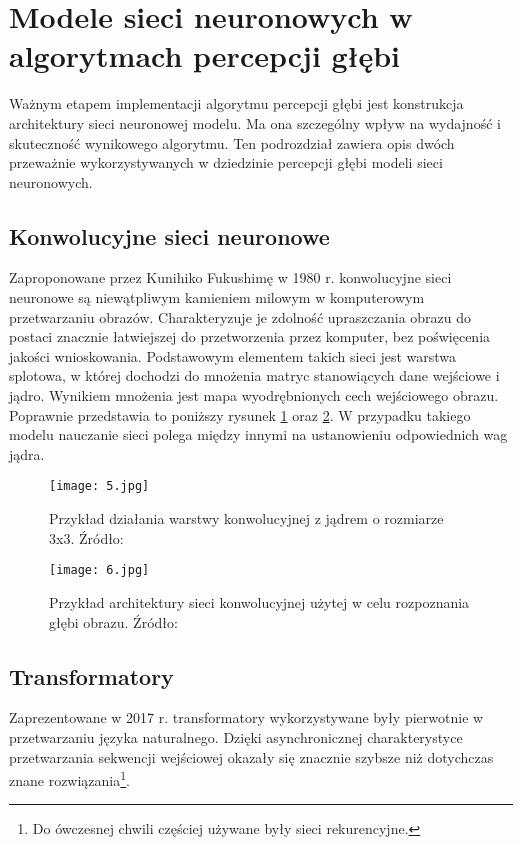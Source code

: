\section{Modele sieci neuronowych w algorytmach percepcji głębi}
Ważnym etapem implementacji algorytmu percepcji głębi jest konstrukcja architektury sieci neuronowej modelu. Ma ona szczególny wpływ na wydajność i skuteczność wynikowego algorytmu. Ten podrozdział zawiera opis dwóch przeważnie wykorzystywanych w dziedzinie percepcji głębi modeli sieci neuronowych.
\subsection{Konwolucyjne sieci neuronowe}
Zaproponowane przez Kunihiko Fukushimę w 1980 r. \cite{fukushima1980} konwolucyjne sieci neuronowe są niewątpliwym kamieniem milowym w komputerowym przetwarzaniu obrazów. Charakteryzuje je zdolność upraszczania obrazu do postaci znacznie łatwiejszej do przetworzenia przez komputer, bez poświęcenia jakości wnioskowania. Podstawowym elementem takich sieci jest warstwa splotowa, w której dochodzi do mnożenia matryc stanowiących dane wejściowe i jądro. Wynikiem mnożenia jest mapa wyodrębnionych cech wejściowego obrazu. Poprawnie przedstawia to poniższy rysunek \ref{fig:warstwa-konwolucyjna} oraz \ref{fig:warstwa-konwolucyjna-arch}. W przypadku takiego modelu nauczanie sieci polega między innymi na ustanowieniu odpowiednich wag jądra.
\begin{figure}[H]
    \centering
    \texttt{[image: 5.jpg]}
    \caption{Przykład działania warstwy konwolucyjnej z jądrem o rozmiarze 3x3. Źródło: \cite{dumoulin2018}}
    \label{fig:warstwa-konwolucyjna}
\end{figure}
\begin{figure}[H]
    \centering
    \texttt{[image: 6.jpg]}
    \caption{Przykład architektury sieci konwolucyjnej użytej w celu rozpoznania głębi obrazu. Źródło: \cite{dong2022}}
    \label{fig:warstwa-konwolucyjna-arch}
\end{figure}

\subsection{Transformatory}
Zaprezentowane w 2017 r. \cite{vaswani2017} transformatory wykorzystywane były pierwotnie w przetwarzaniu języka naturalnego. Dzięki asynchronicznej charakterystyce przetwarzania sekwencji wejściowej okazały się znacznie szybsze niż dotychczas znane rozwiązania\footnote{Do ówczesnej chwili częściej używane były sieci rekurencyjne.}.

